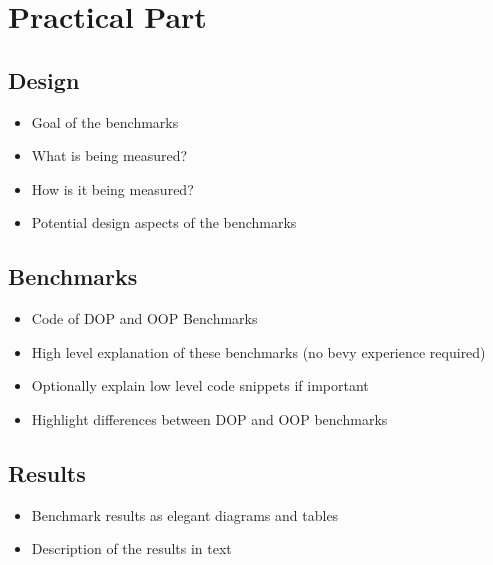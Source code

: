 
\cleardoubleoddpage
\chapter{Practical Part}
\label{sec:practical-part}



\section{Design}
\label{sec:practical-part:design}

\begin{itemize}
    \item Goal of the benchmarks
    \item What is being measured?
    \item How is it being measured?
    \item Potential design aspects of the benchmarks
\end{itemize}



\section{Benchmarks}
\label{sec:practical-part:benchmarks}

\begin{itemize}
    \item Code of DOP and OOP Benchmarks
    \item High level explanation of these benchmarks (no bevy experience required)
    \item Optionally explain low level code snippets if important
    \item Highlight differences between DOP and OOP benchmarks
\end{itemize}



\section{Results}
\label{sec:practical-part:results}

\begin{itemize}
    \item Benchmark results as elegant diagrams and tables
    \item Description of the results in text
\end{itemize}

